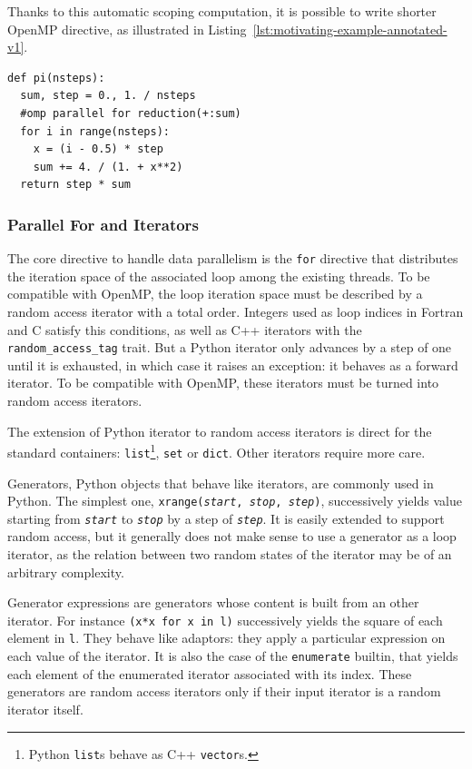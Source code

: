 \documentclass[conference]{IEEEtran}
\begin{document}
Thanks to this automatic scoping computation, it is possible to write shorter
OpenMP directive, as illustrated in
Listing~\ref{lst:motivating-example-annotated-v1}.

\begin{lstlisting}[float, label={lst:motivating-example-annotated-v1}, caption={Motivating
example: computing $\pi$ in Python with OpenMP and automatic scoping.}]
def pi(nsteps):
  sum, step = 0., 1. / nsteps
  #omp parallel for reduction(+:sum)
  for i in range(nsteps):
    x = (i - 0.5) * step
    sum += 4. / (1. + x**2)
  return step * sum
\end{lstlisting}

\subsubsection{Parallel For and Iterators}

The core directive to handle data parallelism is the \texttt{for} directive that
distributes the iteration space of the associated loop among the existing
threads. To be compatible with OpenMP, the loop iteration space must be
described by a random access iterator with a total order. Integers used as loop
indices in Fortran and C satisfy this conditions, as well as C++ iterators with
the \texttt{random\_access\_tag} trait. But a Python iterator only advances by a
step of one until it is exhausted, in which case it raises an exception: it
behaves as a forward iterator. To be compatible with OpenMP, these iterators
must be turned into random access iterators.

The extension of Python iterator to random access iterators is direct for the
standard containers: \texttt{list}\footnote{Python \texttt{list}s behave as C++
\texttt{vector}s.}, \texttt{set} or \texttt{dict}. Other iterators require more
care.

Generators, Python objects that behave like iterators, are commonly used in
Python. The simplest one, \texttt{xrange(\emph{start}, \emph{stop},
\emph{step})}, successively yields value starting from \texttt{\emph{start}} to
\texttt{\emph{stop}} by a step of \texttt{\emph{step}}. It is easily extended to
support random access, but it generally does not make sense to use a generator
as a loop iterator, as the relation between two random states of the iterator
may be of an arbitrary complexity.

Generator expressions are generators whose content is built from an other
iterator. For instance \texttt{(x*x for x in l)} successively yields the square
of each element in \texttt{l}. They behave like adaptors: they apply a
particular expression on each value of the iterator. It is also the case of the
\texttt{enumerate} builtin, that yields each element of the enumerated iterator
associated with its index. These generators are random access iterators only if their
input iterator is a random iterator itself.
\end{document}
